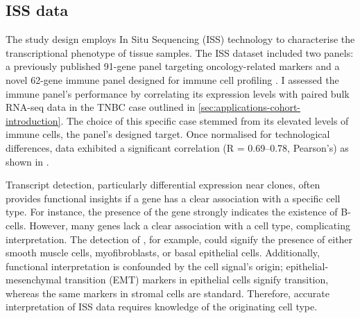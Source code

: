 \subsection{\acl{ISS} data}
\label{sec:modalities-iss}


The study design employs In Situ Sequencing (\ac{ISS}) technology to characterise the transcriptional phenotype of tissue samples. The \ac{ISS} dataset included two panels: a previously published 91-gene panel targeting oncology-related markers and a novel 62-gene immune panel designed for immune cell profiling . I assessed the immune panel's performance by correlating its expression levels with paired bulk RNA-seq data in the \acf{TNBC} case outlined in \cref{sec:applications-cohort-introduction}. The choice of this specific case stemmed from its elevated levels of immune cells, the panel's designed target. Once normalised for technological differences, data exhibited a significant correlation (R = 0.69–0.78, Pearson's) as shown in .

Transcript detection, particularly differential expression near clones, often provides functional insights if a gene has a clear association with a specific cell type. For instance, the presence of the  gene strongly indicates the existence of B-cells. However, many genes lack a clear association with a cell type, complicating interpretation. The detection of , for example, could signify the presence of either smooth muscle cells, myofibroblasts, or basal epithelial cells. Additionally, functional interpretation is confounded by the cell signal's origin; epithelial-mesenchymal transition (EMT) markers in epithelial cells signify transition, whereas the same markers in stromal cells are standard. Therefore, accurate interpretation of \ac{ISS} data requires knowledge of the originating cell type.


